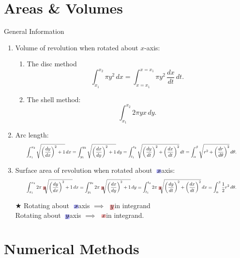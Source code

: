 \documentclass[oneside]{book}
\newcommand{\highlight}[2][red!50]{\mathpalette{\highlightwithstyle[#1]}{#2}}
\newcommand{\highlightwithstyle}[3][red!50]{
  \begingroup                         %
    \sbox0{$\mathsurround 0pt #2#3$}%
    \setlength{\fboxsep}{.5pt}        %
    \sbox2{\hspace{-.5pt}%
      \colorbox{#1}{\usebox0}%
    }%
    \dp2=\dp0 \ht2=\ht0 \wd2=\wd0     %
    \box2                             %
  \endgroup                           %
}
\begin{document}
\section{Areas \& Volumes}
\begin{stbox}{General Information}
  \begin{enumerate}
    \item Volume of revolution when rotated about \(x\)-axis: 
  \begin{enumerate}
    \item The disc method
    \[\int_{x_1}^{x_2}\pi y^2\,dx=\int_{x=x_1}^{x=x_1}\pi y^2\, \frac{dx}{dt}\,dt.\]
    \item The shell method:
    \[\int_{x_1}^{x_2}2\pi yx \,dy.\]
  \end{enumerate}
  \item Arc length:
  \begin{equation*}
    \resizebox{0.9\hsize}{!}{\(\displaystyle\int_{x_1}^{x_2}\sqrt{\left(\frac{dy}{dx}\right)^2+1}\,dx=\int_{y_1}^{y_2} \sqrt{\left(\frac{dx}{dy}\right)^2+1}\,dy=\int_{t_1}^{t_2}\sqrt{\left(\frac{dy}{dt}\right)^2+\left(\frac{dx}{dt}\right)^2}\,dt=\int_{\alpha}^{\beta}\sqrt{r^2+\left(\frac{dr}{d\theta}\right)^2}\,d\theta.\)}
    \end{equation*}
  \item Surface area of revolution when rotated about \(\highlight[blue!30]{x}\)-axis: 
  \begin{equation*}
    \resizebox{0.9\hsize}{!}{\(\displaystyle\int_{x_1}^{x_2}2\pi \highlight[red!30]{y} \sqrt{\left(\frac{dy}{dx}\right)^2+1}\,dx=\int_{y_1}^{y_2}2\pi \highlight[red!30]{y} \sqrt{\left(\frac{dx}{dy}\right)^2+1}\,dy=\int_{t_1}^{t_2}2\pi \highlight[red!30]{y} \sqrt{\left(\frac{dy}{dt}\right)^2+\left(\frac{dx}{dt}\right)^2}\,dx=\int_{\alpha}^{\beta}\frac{1}{2}r^2\,d\theta.\)}
    \end{equation*}
  \begin{flushleft}
    \(\bigstar\) Rotating about \(\highlight[blue!30]{x}\)-axis \(\implies\) \(\highlight[red!30]{y}\) in integrand\\
    \hphantom{\(\bigstar\)} Rotating about \(\highlight[blue!30]{y}\)-axis \(\implies\) \(\highlight[red!30]{x}\) in integrand.
  \end{flushleft}
  \end{enumerate}
\end{stbox}
\newpage
\section{Numerical Methods}
\end{document}
